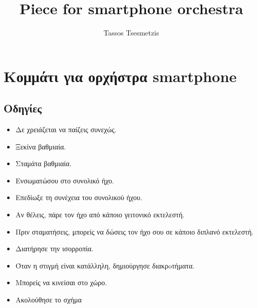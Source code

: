 \documentclass[11pt,letterpage]{book}
\title{Piece for smartphone orchestra}
\author{Tassos Tsesmetzis}
\date{}
\begin{document}
\thispagestyle{empty}
\maketitle

\newpage

\chapter*{ Κομμάτι για ορχήστρα smartphone}
\section*{Οδηγίες}
\begin{itemize}
\item Δε χρειάζεται να παίζεις συνεχώς.
\item Ξεκίνα βαθμιαία.
\item Σταμάτα βαθμιαία.
\item Ενσωματώσου στο συνολικό ήχο.
\item Επεδίωξε τη συνέχεια του συνολικού ήχου.
\item Αν θέλεις, πάρε τον ήχο από κάποιο γειτονικό εκτελεστή.
\item Πριν σταματήσεις, μπορείς να δώσεις τον ήχο σου σε κάποιο διπλανό εκτελεστή.
\item Διατήρησε την ισορροπία.
\item Όταν η στιγμή είναι κατάλληλη, δημιούργησε διακρoτήματα.
\item Μπορείς να κινείσαι στο χώρο.
\item Ακολούθησε το σχήμα\\
  \begin{center}
\end{center}
\end{itemize}
\end{document}
